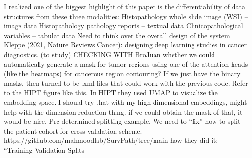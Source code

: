 \documentclass{article}%
\begin{document}
\newline%
\newline%
%
I realized one of the biggest highlight of this paper is the differentiability of data structures from these three modalities:%
\newline%
\newline%
%
Histopathology whole slide image (WSI) – image data  %
\newline%
\newline%
%
Histopathology pathology reports – textual data %
\newline%
\newline%
%
Clinicopathological variables – tabular data %
\newline%
\newline%
%
Need to think over the overall design of the system %
\newline%
\newline%
%
Kleppe (2021, Nature Reviews Cancer): designing deep learning studies in cancer diagnostics. (to study) %
\newline%
\newline%
%
CHECKING WITH BroJuan whether we could automatically generate a mask for tumor regions using one of the attention heads (like the heatmaps) for cancerous region contouring?%
\newline%
\newline%
%
If we just have the binary masks, then turned to be .xml files that could work with the previous code. %
\newline%
\newline%
%
Refer to the HIPT figure like this. %
\newline%
\newline%
%
In HIPT they used UMAP to visualize the embedding space. I should try that with my high dimensional embeddings, might help with the dimension reduction thing. %
\newline%
\newline%
%
if we could obtain the mask of that, it would be nice. %
\newline%
\newline%
%
Pre{-}determined splitting example. We need to “fix” how to split the patient cohort for cross{-}validation scheme. %
\newline%
\newline%
%
https://github.com/mahmoodlab/SurvPath/tree/main %
\newline%
\newline%
%
how they did it: “Training{-}Validation Splits%
\end{document}
